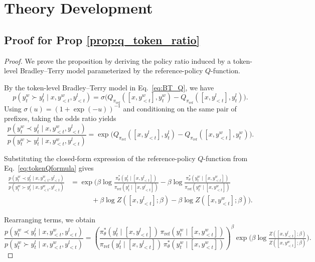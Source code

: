 \documentclass{article}
\theoremstyle{plain}
\theoremstyle{definition}
\theoremstyle{remark}
\begin{document}
\section{Theory Development}
\label{app:theory}

\subsection{Proof for Prop \ref{prop:q_token_ratio}}
\label{subsec:proof_q_token_ratio}
\begin{proof}
We prove the proposition by deriving the policy ratio induced by a
token-level Bradley--Terry model parameterized by the reference-policy
$Q$-function.

By the token-level Bradley--Terry model in Eq.~\eqref{eq:BT_Q}, we have
\begin{equation*}
p(y_t^w \succ y_t^l \mid x, y^w_{<t}, y^l_{<t})
=
\sigma\!\Big(
Q_{\pi_{\mathrm{ref}}}([x,y^w_{<t}], y_t^w)
-
Q_{\pi_{\mathrm{ref}}}([x,y^l_{<t}], y_t^l)
\Big).
\end{equation*}
Using $\sigma(u)=(1+\exp(-u))^{-1}$ and conditioning on the same pair of
prefixes, taking the odds ratio yields
\[
\frac{
p(y_t^w \prec y_t^l \mid x, y^w_{<t}, y^l_{<t})
}{
p(y_t^w \succ y_t^l \mid x, y^w_{<t}, y^l_{<t})
}
=
\exp\!\Big(
Q_{\pi_{\mathrm{ref}}}([x,y^l_{<t}], y_t^l)
-
Q_{\pi_{\mathrm{ref}}}([x,y^w_{<t}], y_t^w)
\Big).
\]

Substituting the closed-form expression of the reference-policy
$Q$-function from Eq.~\eqref{eq:tokenQformula} gives
\[
\begin{aligned}
\frac{
p(y_t^w \prec y_t^l \mid x, y^w_{<t}, y^l_{<t})
}{
p(y_t^w \succ y_t^l \mid x, y^w_{<t}, y^l_{<t})
}
&=
\exp\Bigg(
\beta \log \frac{\pi^*_\theta(y_t^l \mid [x,y^l_{<t}])}
{\pi_{\mathrm{ref}}(y_t^l \mid [x,y^l_{<t}])}
-
\beta \log \frac{\pi^*_\theta(y_t^w \mid [x,y^w_{<t}])}
{\pi_{\mathrm{ref}}(y_t^w \mid [x,y^w_{<t}])}
\\
&\qquad\quad
+
\beta \log Z([x,y^l_{<t}]; \beta)
-
\beta \log Z([x,y^w_{<t}]; \beta)
\Bigg).
\end{aligned}
\]

Rearranging terms, we obtain
\[
\frac{
p(y_t^w \prec y_t^l \mid x, y^w_{<t}, y^l_{<t})
}{
p(y_t^w \succ y_t^l \mid x, y^w_{<t}, y^l_{<t})
}
=
\left(
\frac{
\pi^*_\theta(y_t^l \mid [x,y^l_{<t}])\,
\pi_{\mathrm{ref}}(y_t^w \mid [x,y^w_{<t}])
}{
\pi_{\mathrm{ref}}(y_t^l \mid [x,y^l_{<t}])\,
\pi^*_\theta(y_t^w \mid [x,y^w_{<t}])
}
\right)^{\!\beta}
\exp\!\Big(
\beta \log \tfrac{Z([x,y^l_{<t}]; \beta)}{Z([x,y^w_{<t}]; \beta)}
\Big).
\]


\end{proof}
\end{document}
